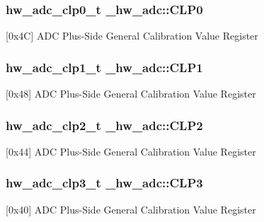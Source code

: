 \subsubsection[{\texorpdfstring{C\+L\+P0}{CLP0}}]{ {\bf hw\+\_\+adc\+\_\+clp0\+\_\+t} \+\_\+hw\+\_\+adc\+::\+C\+L\+P0}\hypertarget{struct__hw__adc_ab032ac0a055e3ddd1768894d520cdd4e}{}\label{struct__hw__adc_ab032ac0a055e3ddd1768894d520cdd4e}
\mbox{[}0x4C\mbox{]} A\+DC Plus-\/\+Side General Calibration Value Register 
\subsubsection[{\texorpdfstring{C\+L\+P1}{CLP1}}]{ {\bf hw\+\_\+adc\+\_\+clp1\+\_\+t} \+\_\+hw\+\_\+adc\+::\+C\+L\+P1}\hypertarget{struct__hw__adc_a94b53ba3df7aabd1524f1260fb7b6578}{}\label{struct__hw__adc_a94b53ba3df7aabd1524f1260fb7b6578}
\mbox{[}0x48\mbox{]} A\+DC Plus-\/\+Side General Calibration Value Register 
\subsubsection[{\texorpdfstring{C\+L\+P2}{CLP2}}]{ {\bf hw\+\_\+adc\+\_\+clp2\+\_\+t} \+\_\+hw\+\_\+adc\+::\+C\+L\+P2}\hypertarget{struct__hw__adc_ac2bf719008b390353a1e16d209962f3a}{}\label{struct__hw__adc_ac2bf719008b390353a1e16d209962f3a}
\mbox{[}0x44\mbox{]} A\+DC Plus-\/\+Side General Calibration Value Register 
\subsubsection[{\texorpdfstring{C\+L\+P3}{CLP3}}]{ {\bf hw\+\_\+adc\+\_\+clp3\+\_\+t} \+\_\+hw\+\_\+adc\+::\+C\+L\+P3}\hypertarget{struct__hw__adc_a570e4efa2070cb865546b5a6923e5037}{}\label{struct__hw__adc_a570e4efa2070cb865546b5a6923e5037}
\mbox{[}0x40\mbox{]} A\+DC Plus-\/\+Side General Calibration Value Register 
